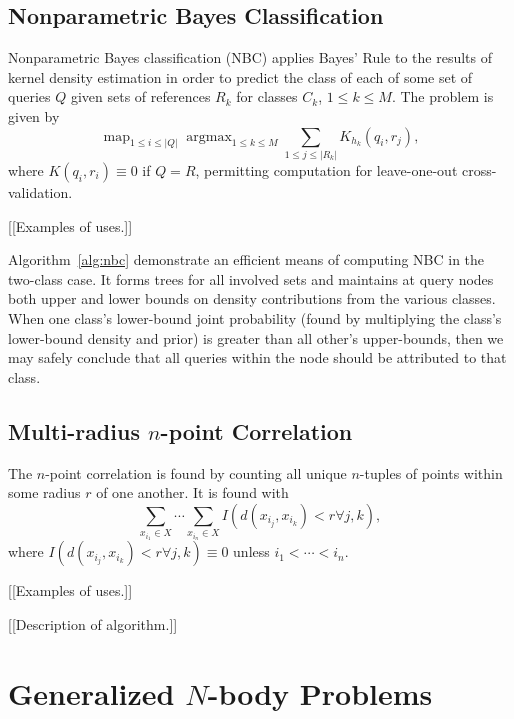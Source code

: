 \documentclass{article}
\DeclareMathOperator*{\argmax}{argmax}
\DeclareMathOperator*{\map}{map}
\begin{document}
\subsection{Nonparametric Bayes Classification}

Nonparametric Bayes classification (NBC) applies Bayes' Rule to the
results of kernel density estimation in order to predict the class of
each of some set of queries $Q$ given sets of references $R_k$ for
classes $C_k$, $1 \leq k \leq M$.  The problem is given by
\[
\map_{1 \leq i \leq |Q|} \argmax_{1 \leq k \leq M} \sum_{1 \leq j \leq |R_k|} K_{h_k}(q_i,r_j),
\]
where $K(q_i,r_i) \equiv 0$ if $Q = R$, permitting computation for
leave-one-out cross-validation.

[[Examples of uses.]]

Algorithm~\ref{alg:nbc} demonstrate an efficient means of computing
NBC in the two-class case.  It forms trees for all involved sets and
maintains at query nodes both upper and lower bounds on density
contributions from the various classes.  When one class's lower-bound
joint probability (found by multiplying the class's lower-bound
density and prior) is greater than all other's upper-bounds, then we
may safely conclude that all queries within the node should be
attributed to that class.

\subsection{Multi-radius $n$-point Correlation}

The $n$-point correlation is found by counting all unique $n$-tuples
of points within some radius $r$ of one another.  It is found with
\[
\sum_{x_{i_1} \in X} \cdots \sum_{x_{i_n} \in X} I(d(x_{i_j},x_{i_k}) < r \forall j,k),
\]
where $I(d(x_{i_j},x_{i_k}) < r \forall j,k) \equiv 0$ unless $i_1 <
\cdots < i_n$.

[[Examples of uses.]]

[[Description of algorithm.]]

\section{Generalized $N$-body Problems}
\end{document}
